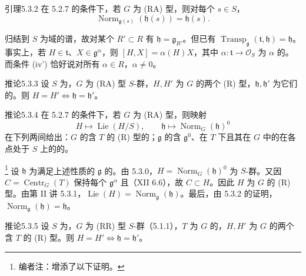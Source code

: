 \begin{SGAresult}{引理}{5.3.2} 在 5.2.7 的条件下，若 $G$ 为 (RA) 型，则对每个 $s\in S$，
\[\operatorname{Norm}_{\mathfrak g(s)}(\mathfrak h(s))=\mathfrak h(s).\]
\end{SGAresult}
归结到 $S$ 为域的谱，故对某个 $R'\subset R$ 有 $\mathfrak h=\mathfrak g_{R'}$。但已有 $\operatorname{Transp}_{\mathfrak g}(\mathfrak t,\mathfrak h)=\mathfrak h$。事实上，若 $H\in\mathfrak t$、$X\in\mathfrak g^\alpha$，则 $[H,X]=\alpha(H)X$，其中 $\alpha:\mathfrak t\to\mathcal O_S$ 为 $\alpha$ 的。而条件 (iv') 恰好说对所有 $\alpha\in R$，$\alpha\ne0$。
\begin{SGAresult}{推论}{5.3.3} 设 $S$ 为，$G$ 为 (RA) 型 $S$-群，$H,H'$ 为 $G$ 的两个 (R) 型，$\mathfrak h,\mathfrak h'$ 为它们的。则 $H=H'\Longleftrightarrow\mathfrak h=\mathfrak h'$。\end{SGAresult}
\begin{SGAresult}{推论}{5.3.4} 在 5.2.7 的条件下，若 $G$ 为 (RA) 型，则映射
\[H\longmapsto\operatorname{Lie}(H/S),\qquad\mathfrak h\longmapsto\operatorname{Norm}_G(\mathfrak h)^0\]
在下列两间给出：$G$ 的含 $T$ 的 (R) 型的；$\mathfrak g$ 的含 $\mathfrak g^0$、在 $T$ 下且其在 $G$ 中的在各点处于 $S$ 上的的。
\end{SGAresult}
\footnote{编者注：增添了以下证明。} 设 $\mathfrak h$ 为满足上述性质的 $\mathfrak g$ 的。由 5.3.0，$H=\operatorname{Norm}_G(\mathfrak h)^0$ 为 $S$-群。又因 $C=\operatorname{Centr}_G(T)$ 保持每个 $\mathfrak g^\alpha$ 且（XII 6.6），故 $C\subset H$。因此
$H$ 为 $G$ 的 (R) 型。由第 II 讲 5.3.1，$\operatorname{Lie}(H)=\operatorname{Norm}_{\mathfrak g}(\mathfrak h)$。最后，由 5.3.2 的证明，$\operatorname{Norm}_{\mathfrak g}(\mathfrak h)=\mathfrak h$。
\begin{SGAresult}{推论}{5.3.5} 设 $S$ 为，$G$ 为 (RR) 型 $S$-群（5.1.1），$T$ 为 $G$ 的，$H,H'$ 为 $G$ 的两个含 $T$ 的 (R) 型。则 $H=H'\Longleftrightarrow\mathfrak h=\mathfrak h'$。\end{SGAresult}
